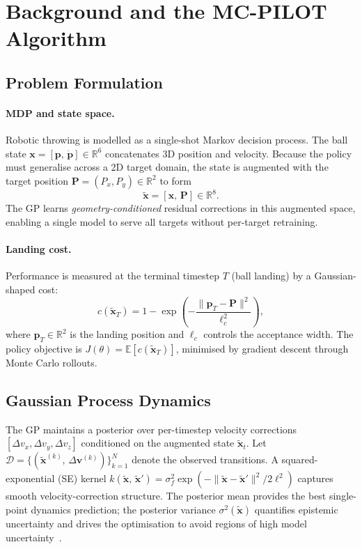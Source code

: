 \section{Background and the MC-PILOT Algorithm}
\label{sec:background}

\subsection{Problem Formulation}
\label{sec:background:problem}

\paragraph{MDP and state space.}
Robotic throwing is modelled as a single-shot Markov decision process.
The ball state $\mathbf{x} = [\mathbf{p},\, \dot{\mathbf{p}}] \in \mathbb{R}^6$
concatenates 3D position and velocity.
Because the policy must generalise across a 2D target domain, the state is augmented
with the target position $\mathbf{P} = (P_x, P_y) \in \mathbb{R}^2$ to form
\begin{equation}
  \tilde{\mathbf{x}} = [\mathbf{x},\, \mathbf{P}] \in \mathbb{R}^8.
  \label{eq:augmented_state}
\end{equation}
The GP learns \emph{geometry-conditioned} residual corrections in this augmented space,
enabling a single model to serve all targets without per-target retraining.

\paragraph{Landing cost.}
Performance is measured at the terminal timestep $T$ (ball landing) by a
Gaussian-shaped cost:
\begin{equation}
  c(\tilde{\mathbf{x}}_T) = 1 - \exp\!\left(
    -\frac{\|\mathbf{p}_T - \mathbf{P}\|^2}{\ell_c^2}
  \right),
  \label{eq:cost}
\end{equation}
where $\mathbf{p}_T \in \mathbb{R}^2$ is the landing position and $\ell_c$ controls
the acceptance width.
The policy objective is $J(\theta) = \mathbb{E}[c(\tilde{\mathbf{x}}_T)]$, minimised
by gradient descent through Monte Carlo rollouts.

\subsection{Gaussian Process Dynamics}
\label{sec:background:gp}

The GP maintains a posterior over per-timestep velocity corrections
$[\Delta v_x, \Delta v_y, \Delta v_z]$ conditioned on the augmented state
$\tilde{\mathbf{x}}_t$.
Let $\mathcal{D} = \{(\tilde{\mathbf{x}}^{(k)},\, \Delta \mathbf{v}^{(k)})\}_{k=1}^N$
denote the observed transitions.
A squared-exponential (SE) kernel
$k(\tilde{\mathbf{x}},\, \tilde{\mathbf{x}}') = \sigma_f^2 \exp(-\|\tilde{\mathbf{x}}
- \tilde{\mathbf{x}}'\|^2 / 2\ell^2)$
captures smooth velocity-correction structure.
The posterior mean provides the best single-point dynamics prediction; the
posterior variance $\sigma^2(\tilde{\mathbf{x}})$ quantifies epistemic uncertainty and
drives the optimisation to avoid regions of high model uncertainty~\cite{rasmussen2006gp}.

